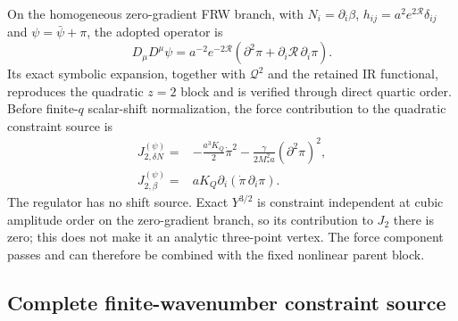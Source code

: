 On the homogeneous zero-gradient FRW branch, with
$N_i=\partial_i\beta$, $h_{ij}=a^2e^{2\mathcal R}\delta_{ij}$ and
$\psi=\bar\psi+\pi$, the adopted operator is
\begin{equation}
 D_\mu D^\mu\psi
 =a^{-2}e^{-2\mathcal R}
  (\partial^2\pi+\partial_i\mathcal R\,\partial_i\pi).
 \label{eq:track-a-adm-laplacian}
\end{equation}
Its exact symbolic expansion, together with $\mathcal Q^2$ and the retained IR
functional, reproduces the quadratic $z=2$ block and is verified through
direct quartic order.  Before finite-$q$ scalar-shift normalization, the force
contribution to the quadratic constraint source is
\begin{align}
 J_{2,\delta N}^{(\psi)}={}&-\frac{a^3K_Q}{2}\dot\pi^2
 -\frac{\gamma}{2M_*^2a}(\partial^2\pi)^2,
 \nonumber\\
 J_{2,\beta}^{(\psi)}={}&aK_Q\partial_i
 (\dot\pi\,\partial_i\pi).
 \label{eq:track-a-force-j2}
\end{align}
The regulator has no shift source.  Exact $Y^{3/2}$ is constraint independent
at cubic amplitude order on the zero-gradient branch, so its contribution to
$J_2$ there is zero; this does not make it an analytic three-point vertex.
The force component passes and can therefore be combined with the fixed
nonlinear parent block.

\subsection{Complete finite-wavenumber constraint source}

